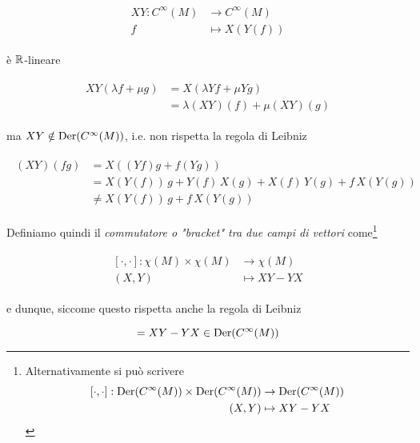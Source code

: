 \begin{align}
	\begin{split}
		X Y : C^{\infty}(M) &\to C^{\infty}(M)\\
		f &\mapsto X(Y(f))
	\end{split}
\end{align}

è $ \mathbb{R} $-lineare

\begin{align}
	\begin{split}
		X Y (\lambda f + \mu g) &= X (\lambda Y f + \mu Y g)\\
		&= \lambda (XY)(f) + \mu (XY)(g)
	\end{split}
\end{align}

ma $ XY \notin \operatorname{Der}(C^{\infty}(M)) $, i.e. non rispetta la regola di Leibniz

\begin{align}
	\begin{split}
		(XY)(fg) &= X ((Yf) g + f (Y g))\\
		&= X(Y(f)) \, g + Y(f) \, X(g) + X(f) \, Y(g) + f \, X(Y(g))\\
		&\neq X(Y(f)) \, g + f \, X(Y(g))
	\end{split}
\end{align}

Definiamo quindi il \textit{commutatore o "bracket" tra due campi di vettori} come\footnote{%
	Alternativamente si può scrivere
	\begin{align}
		\begin{split}
			[\cdot,\cdot] : \operatorname{Der}(C^{\infty}(M)) \times \operatorname{Der}(C^{\infty}(M)) &\to \operatorname{Der}(C^{\infty}(M))\\
			(X,Y) &\mapsto XY-YX
		\end{split}
	\end{align}%
}

\begin{align}
	\begin{split}
		[\cdot,\cdot] : \chi(M) \times \chi(M) &\to \chi(M)\\
		(X,Y) &\mapsto XY-YX
	\end{split}
\end{align}

e dunque, siccome questo rispetta anche la regola di Leibniz

\begin{equation}
	[X,Y] = XY-YX \in \der(C^{\infty}(M))
\end{equation}

